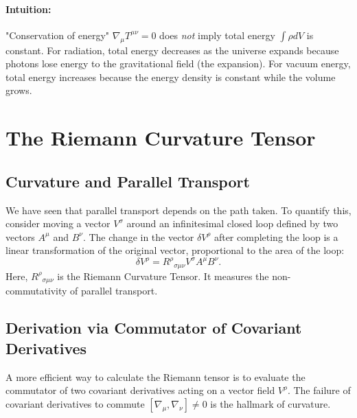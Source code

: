 \documentclass[11pt, a4paper]{report}
\begin{document}
\paragraph{Intuition:} "Conservation of energy" \(\nabla_\mu T^{\mu\nu}=0\) does \emph{not} imply total energy \(\int \rho dV\) is constant. For radiation, total energy decreases as the universe expands because photons lose energy to the gravitational field (the expansion). For vacuum energy, total energy increases because the energy density is constant while the volume grows.
\section{The Riemann Curvature Tensor}

\subsection*{Curvature and Parallel Transport}
We have seen that parallel transport depends on the path taken. To quantify this, consider moving a vector \(V^\sigma\) around an infinitesimal closed loop defined by two vectors \(A^\mu\) and \(B^\nu\). The change in the vector \(\delta V^\rho\) after completing the loop is a linear transformation of the original vector, proportional to the area of the loop:
\begin{equation}
\delta V^\rho = {R^\rho}_{\sigma\mu\nu} V^\sigma A^\mu B^\nu.
\end{equation}
Here, \({R^\rho}_{\sigma\mu\nu}\) is the Riemann Curvature Tensor. It measures the non-commutativity of parallel transport.

\subsection*{Derivation via Commutator of Covariant Derivatives}
A more efficient way to calculate the Riemann tensor is to evaluate the commutator of two covariant derivatives acting on a vector field \(V^\rho\). The failure of covariant derivatives to commute \([\nabla_\mu, \nabla_\nu] \neq 0\) is the hallmark of curvature.
\end{document}
